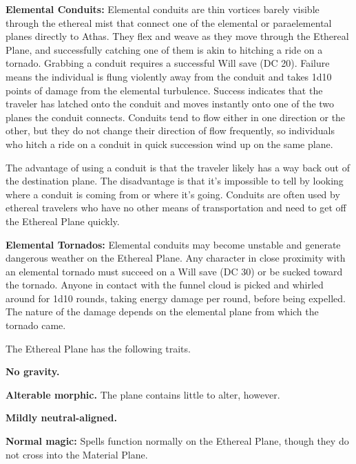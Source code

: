 \textbf{Elemental Conduits:} Elemental conduits are thin vortices barely visible through the ethereal mist that connect one of the elemental or paraelemental planes directly to Athas. They flex and weave as they move through the Ethereal Plane, and successfully catching one of them is akin to hitching a ride on a tornado. Grabbing a conduit requires a successful Will save (DC 20). Failure means the individual is flung violently away from the conduit and takes 1d10 points of damage from the elemental turbulence. Success indicates that the traveler has latched onto the conduit and moves instantly onto one of the two planes the conduit connects. Conduits tend to flow either in one direction or the other, but they do not change their direction of flow frequently, so individuals who hitch a ride on a conduit in quick succession wind up on the same plane.

The advantage of using a conduit is that the traveler likely has a way back out of the destination plane. The disadvantage is that it's impossible to tell by looking where a conduit is coming from or where it's going. Conduits are often used by ethereal travelers who have no other means of transportation and need to get off the Ethereal Plane quickly.

\textbf{Elemental Tornados:} Elemental conduits may become unstable and generate dangerous weather on the Ethereal Plane. Any character in close proximity with an elemental tornado must succeed on a Will save (DC 30) or be sucked toward the tornado. Anyone in contact with the funnel cloud is picked and whirled around for 1d10 rounds, taking energy damage per round, before being expelled. The nature of the damage depends on the elemental plane from which the tornado came.


The Ethereal Plane has the following traits.
\begin{itemize*}
\item \textbf{No gravity.}
\item \textbf{Alterable morphic.} The plane contains little to alter, however.
\item \textbf{Mildly neutral-aligned.}
\item \textbf{Normal magic:} Spells function normally on the Ethereal Plane, though they do not cross into the Material Plane.
\end{itemize*}